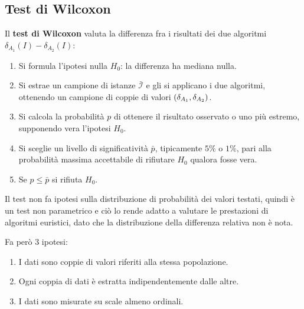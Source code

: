 \documentclass[\main/main.tex]{subfiles}
\begin{document}
\subsection{Test di Wilcoxon}
\begin{definition}
    Il \textbf{test di Wilcoxon} valuta la differenza fra i risultati dei due algoritmi \(\delta_{A_1}(I) - \delta_{A_2}(I)\):
\begin{enumerate}
    \item Si formula l'ipotesi nulla \(H_0\): la differenza ha mediana nulla.
    \item Si estrae un campione di istanze \(\bar{\mathcal{I}}\) e gli si applicano i due algoritmi, ottenendo un campione di coppie di valori \(\left(\delta_{A_1}, \delta_{A_2}\right)\).
    \item Si calcola la probabilità \(p\) di ottenere il risultato osservato o uno più estremo, supponendo vera l'ipotesi \(H_0\).
    \item Si sceglie un livello di significatività \(\bar{p}\), tipicamente \(5\%\) o \(1\%\), pari alla probabilità massima accettabile di rifiutare \(H_0\) qualora fosse vera.
    \item Se \(p \leq \bar{p}\) si rifiuta \(H_0\).
\end{enumerate}
\end{definition}
\begin{observation}
Il test non fa ipotesi sulla distribuzione di probabilità dei valori testati, quindi è un test non parametrico e ciò lo rende adatto a valutare le prestazioni di algoritmi euristici, dato che la distribuzione della differenza relativa non è nota.

Fa però 3 ipotesi:
\begin{enumerate}
    \item I dati sono coppie di valori riferiti alla stessa popolazione.
    \item Ogni coppia di dati è estratta indipendentemente dalle altre.
    \item I dati sono misurate su scale almeno ordinali.
\end{enumerate}
\end{observation}
\end{document}
